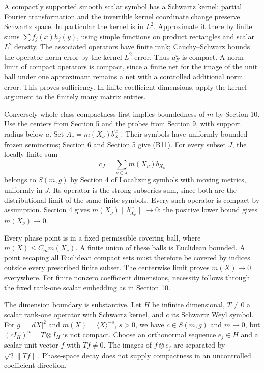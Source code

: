 \documentclass[
  11pt,
]{article}
\begin{document}
A compactly supported smooth scalar symbol has a Schwartz kernel:
partial Fourier transformation and the invertible kernel coordinate
change preserve Schwartz space. In particular the kernel is in \(L^2\).
Approximate it there by finite sums \(\sum f_j(x)h_j(y)\), using simple
functions on product rectangles and scalar \(L^2\) density. The
associated operators have finite rank; Cauchy--Schwarz bounds the
operator-norm error by the kernel \(L^2\) error. Thus \(a_F^w\) is
compact. A norm limit of compact operators is compact, since a finite
net for the image of the unit ball under one approximant remains a net
with a controlled additional norm error. This proves sufficiency. In
finite coefficient dimensions, apply the kernel argument to the finitely
many matrix entries.

Conversely whole-class compactness first implies boundedness of \(m\) by
Section 10. Use the centers from Section 5 and the probes from Section
9, with support radius below \(a\). Set \(A_\nu=m(X_\nu)b_{X_\nu}^w\).
Their symbols have uniformly bounded frozen seminorms; Section 6 and
Section 5 give (B11). For every subset \(J\), the locally finite sum \[
 c_J=\sum_{\nu\in J}m(X_\nu)b_{X_\nu}
 \tag{B37}
\] belongs to \(S(m,g)\) by Section 4 of
\href{metric-localization.pdf}{Localizing symbols with moving metrics},
uniformly in \(J\). Its operator is the strong subseries sum, since both
are the distributional limit of the same finite symbols. Every such
operator is compact by assumption. Section 4 gives
\(m(X_\nu)\|b_{X_\nu}^w\|\to0\); the positive lower bound gives
\(m(X_\nu)\to0\).

Every phase point is in a fixed permissible covering ball, where
\(m(X)\le C_m m(X_\nu)\). A finite union of these balls is Euclidean
bounded. A point escaping all Euclidean compact sets must therefore be
covered by indices outside every prescribed finite subset. The
centerwise limit proves \(m(X)\to0\) everywhere. For finite nonzero
coefficient dimensions, necessity follows through the fixed rank-one
scalar embedding as in Section 10.

The dimension boundary is substantive. Let \(H\) be infinite
dimensional, \(T\ne0\) a scalar rank-one operator with Schwartz kernel,
and \(c\) its Schwartz Weyl symbol. For \(g=|dX|^2\) and
\(m(X)=\langle X\rangle^{-s}\), \(s>0\), we have \(c\in S(m,g)\) and
\(m\to0\), but \((cI_H)^w=T\otimes I_H\) is not compact. Choose an
orthonormal sequence \(e_j\in H\) and a scalar unit vector \(f\) with
\(Tf\ne0\). The images of \(f\otimes e_j\) are separated by
\(\sqrt2\|Tf\|\). Phase-space decay does not supply compactness in an
uncontrolled coefficient direction.
\end{document}

